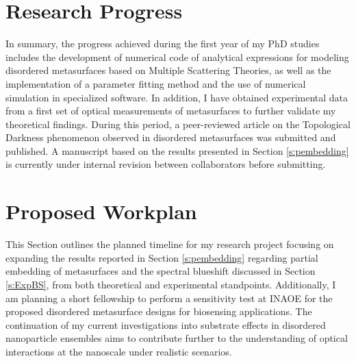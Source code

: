 
\section*{Research Progress}

In summary, the progress achieved during the first year of my PhD studies includes the development of numerical code of analytical expressions for modeling disordered metasurfaces based on Multiple Scattering Theories, as well as the implementation of a parameter fitting method and the use of  numerical simulation in specialized software. In addition, I have obtained experimental data from a first set of optical measurements of metasurfaces to further validate my theoretical findings. During this period, a peer-reviewed article on the Topological Darkness phenomenon observed in disordered metasurfaces was submitted and published. A manuscript based on the results presented in Section \ref{s:pembedding} is currently under internal revision between collaborators before submitting. 


\section*{Proposed Workplan}

This Section outlines the planned timeline for my research project focusing on expanding the results reported in Section \ref{s:pembedding} regarding partial embedding of metasurfaces and the spectral blueshift discussed in Section \ref{s:ExpBS}, from both theoretical and experimental standpoints. Additionally, I am planning a short fellowship to perform a sensitivity test at INAOE for the proposed disordered metasurface designs for biosensing applications. The continuation of my current investigations into substrate effects in disordered nanoparticle ensembles aims to contribute further to the understanding of optical interactions at the nanoscale under realistic scenarios.

